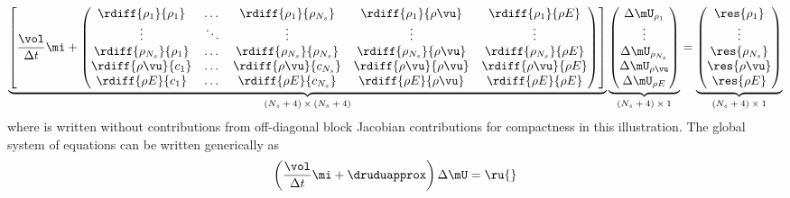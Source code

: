 \begin{equation}
  \underbrace{
    \left[ 
      \frac{\vol}{\Delta t} \mi + 
      \begin{pmatrix}
        \rdiff{\rho_1}{\rho_1}     & \dots  & \rdiff{\rho_1}{\rho_{N_s}}     & \rdiff{\rho_1}{\rho \vu}     & \rdiff{\rho_1}{\rho E}      \\
        \vdots                     & \ddots & \vdots                         & \vdots                       & \vdots                      \\
        \rdiff{\rho_{N_s}}{\rho_1} & \dots  & \rdiff{\rho_{N_s}}{\rho_{N_s}} & \rdiff{\rho_{N_s}}{\rho \vu} &  \rdiff{\rho_{N_s}}{\rho E} \\
        \rdiff{\rho \vu}{c_1}      & \dots  & \rdiff{\rho \vu}{c_{N_s}}      & \rdiff{\rho \vu}{\rho \vu}   &  \rdiff{\rho \vu}{\rho E}   \\
        \rdiff{\rho E}{c_1}        & \dots  & \rdiff{\rho E}{c_{N_s}}        & \rdiff{\rho E}{\rho \vu}     &  \rdiff{\rho E}{\rho E}
      \end{pmatrix}
    \right]
  }_\text{$(N_s + 4) \times (N_s + 4)$}
  \underbrace{
    \begin{pmatrix}
      \Delta \mU_{\rho_1}     \\
      \vdots          \\
      \Delta \mU_{\rho_{N_s}} \\
      \Delta \mU_{\rho \vu}   \\
      \Delta \mU_{\rho E}
    \end{pmatrix}
  }_\text{$(N_s + 4) \times 1$}
  =
  \underbrace{
    \begin{pmatrix}
      \res{\rho_1}     \\
      \vdots           \\
      \res{\rho_{N_s}} \\
      \res{\rho \vu}   \\
      \res{\rho E}
    \end{pmatrix}
  }_\text{$(N_s + 4) \times 1$}
  \label{drdu-fc-flow}
\end{equation}
where  is written without contributions from off-diagonal
block Jacobian contributions for compactness in this illustration.  The global
system of equations can be written generically as
\begin{equation}
  \left( \frac{\vol}{\Delta t} \mi + \druduapprox \right)\Delta \mU = \ru{}
  \label{fc-global}
\end{equation}
